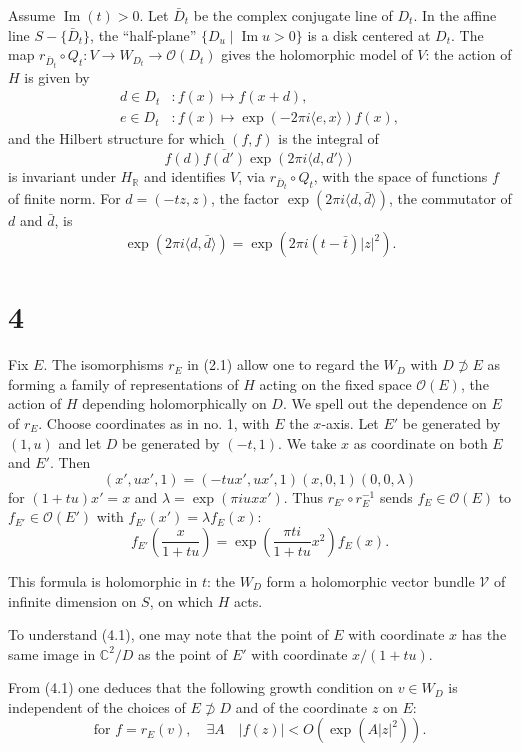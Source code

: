 \documentclass[12pt,a4paper]{article}
\theoremstyle{plain}
\theoremstyle{definition}
\theoremstyle{remark}
\DeclareMathOperator{\Impart}{Im}
\begin{document}
Assume $\Impart(t)>0$. Let $\bar D_t$ be the complex conjugate line of $D_t$. In the affine line $S-\{\bar D_t\}$, the ``half-plane'' $\{D_u\mid \Impart u>0\}$ is a disk centered at $D_t$. The map $r_{\bar D_t}\circ Q_t\colon V\to W_{D_t}\to \mathcal O(D_t)$ gives the holomorphic model of $V$: the action of $H$ is given by
\begin{align*}
d\in D_t&\colon f(x)\mapsto f(x+d),\\
e\in D_t&\colon f(x)\mapsto \exp(-2\pi i\langle e,x\rangle)f(x),\tag{3.1}
\end{align*}
and the Hilbert structure for which $(f,f)$ is the integral of
\[
f(d)\overline{f(d')}\exp(2\pi i\langle d,d'\rangle)
\]
is invariant under $H_{\mathbb R}$ and identifies $V$, via $r_{\bar D_t}\circ Q_t$, with the space of functions $f$ of finite norm. For $d=(-tz,z)$, the factor $\exp(2\pi i\langle d,\bar d\rangle)$, the commutator of $d$ and $\bar d$, is
\[
\exp(2\pi i\langle d,\bar d\rangle)=\exp(2\pi i(t-\bar t)|z|^2).
\]

\section*{4}

Fix $E$. The isomorphisms $r_E$ in (2.1) allow one to regard the $W_D$ with $D\not\supset E$ as forming a family of representations of $H$ acting on the fixed space $\mathcal O(E)$, the action of $H$ depending holomorphically on $D$. We spell out the dependence on $E$ of $r_E$. Choose coordinates as in no. 1, with $E$ the $x$-axis. Let $E'$ be generated by $(1,u)$ and let $D$ be generated by $(-t,1)$. We take $x$ as coordinate on both $E$ and $E'$. Then
\[
(x',ux',1)=(-tux',ux',1)(x,0,1)(0,0,\lambda)
\]
for $(1+tu)x'=x$ and $\lambda=\exp(\pi iuxx')$. Thus $r_{E'}\circ r_E^{-1}$ sends $f_E\in \mathcal O(E)$ to $f_{E'}\in \mathcal O(E')$ with $f_{E'}(x')=\lambda f_E(x)$:
\begin{equation}\label{eq:4.1}
f_{E'}\left(\frac{x}{1+tu}\right)=\exp\left(\frac{\pi ti}{1+tu}x^2\right)f_E(x).\tag{4.1}
\end{equation}

This formula is holomorphic in $t$: the $W_D$ form a holomorphic vector bundle $\mathscr V$ of infinite dimension on $S$, on which $H$ acts.

To understand (4.1), one may note that the point of $E$ with coordinate $x$ has the same image in $\mathbb C^2/D$ as the point of $E'$ with coordinate $x/(1+tu)$.

From (4.1) one deduces that the following growth condition on $v\in W_D$ is independent of the choices of $E\not\supset D$ and of the coordinate $z$ on $E$:
\begin{equation}\label{eq:4.2}
\text{for }f=r_E(v),\quad \exists A\quad |f(z)|<O(\exp(A|z|^2)).\tag{4.2}
\end{equation}
\end{document}
